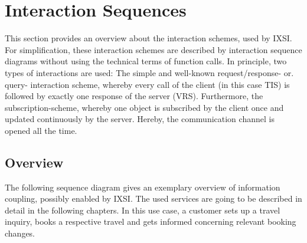 \chapter{Interaction Sequences}
\label{cha:Interaktionsprotokolle}
This section provides an overview about the interaction schemes, used by IXSI. For simplification, these interaction schemes are described by interaction sequence diagrams without using the technical terms of function calls. In principle, two types of interactions are used: The simple and well-known request/response- or. query- interaction scheme, whereby every call of the client (in this case TIS) is followed by exactly one response of the server (VRS). Furthermore, the subscription-scheme, whereby one object is subscribed by the client once and updated continuously by the server. Hereby, the communication channel is opened all the time. 

\section{Overview}
The following sequence diagram gives an exemplary overview of information coupling, possibly enabled by IXSI. The used services are going to be described in detail in the following chapters. In this use case, a customer sets up a travel inquiry, books a respective travel and gets informed concerning relevant booking changes. 

